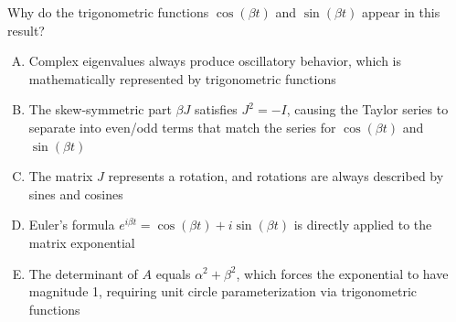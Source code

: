 \documentclass[12pt]{amsart}
\begin{document}
Why do the trigonometric functions $\cos(\beta t)$ and $\sin(\beta t)$ appear in this result?

\begin{enumerate}[(A)]
\item Complex eigenvalues always produce oscillatory behavior, which is mathematically represented by trigonometric functions
\item The skew-symmetric part $\beta J$ satisfies $J^2 = -I$, causing the Taylor series to separate into even/odd terms that match the series for $\cos(\beta t)$ and $\sin(\beta t)$
\item The matrix $J$ represents a rotation, and rotations are always described by sines and cosines
\item Euler's formula $e^{i\beta t} = \cos(\beta t) + i\sin(\beta t)$ is directly applied to the matrix exponential
\item The determinant of $A$ equals $\alpha^2 + \beta^2$, which forces the exponential to have magnitude 1, requiring unit circle parameterization via trigonometric functions
\end{enumerate}

\end{document}

